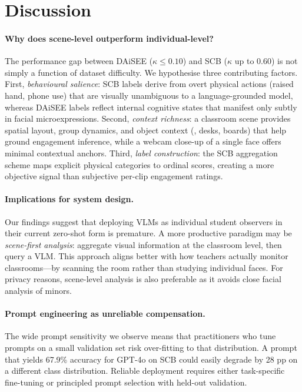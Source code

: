 \section{Discussion}
\label{sec:discussion}

\paragraph{Why does scene-level outperform individual-level?}
The performance gap between DAiSEE ($\kappa \leq 0.10$) and SCB
($\kappa$ up to 0.60) is not simply a function of dataset difficulty.
We hypothesise three contributing factors.  First, \emph{behavioural
salience}: SCB labels derive from overt physical actions (raised hand,
phone use) that are visually unambiguous to a language-grounded model,
whereas DAiSEE labels reflect internal cognitive states that manifest
only subtly in facial microexpressions.  Second, \emph{context richness}:
a classroom scene provides spatial layout, group dynamics, and object
context (\eg, desks, boards) that help ground engagement inference,
while a webcam close-up of a single face offers minimal contextual anchors.
Third, \emph{label construction}: the SCB aggregation scheme maps
explicit physical categories to ordinal scores, creating a more
objective signal than subjective per-clip engagement ratings.

\paragraph{Implications for system design.}
Our findings suggest that deploying VLMs as individual student observers
in their current zero-shot form is premature.  A more productive
paradigm may be \emph{scene-first analysis}: aggregate visual information
at the classroom level, then query a VLM.  This approach aligns better
with how teachers actually monitor classrooms---by scanning the room
rather than studying individual faces.  For privacy reasons, scene-level
analysis is also preferable as it avoids close facial analysis of minors.

\paragraph{Prompt engineering as unreliable compensation.}
The wide prompt sensitivity we observe means that practitioners who tune
prompts on a small validation set risk over-fitting to that distribution.
A prompt that yields 67.9\% accuracy for GPT-4o on SCB could easily
degrade by 28 pp on a different class distribution.  Reliable deployment
requires either task-specific fine-tuning or principled prompt selection
with held-out validation.

